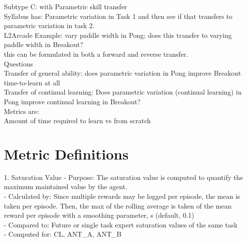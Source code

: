     Subtype C: with Parametric skill transfer\\
        Syllabus has: Parametric variation in Task 1 and then see if that transfers to parametric variation in task 2.\\
        L2Arcade Example: vary paddle width in Pong; does this transfer to varying paddle width in Breakout? \\
            this can be formulated in both a forward and reverse transfer.\\
        Questions\\
            Transfer of general ability: does parametric variation in Pong improve Breakout time-to-learn at all\\
            Transfer of continual learning: Does parametric variation (continual learning) in Pong improve continual learning in Breakout?\\
        Metrics are:\\
            Amount of time required to learn vs from scratch \\
            
\iffalse           
    Compositional skill transfer
        we see this as an instance of 3c 
            Hava mentioned this as a prime goal for L2M program.
            Concern
                How do we identify the "skill relationships" between the tasks? Do we need to do this before designing the syllabus?
            Motivation: system learns Tasks T1, T2, T3 (each having one or more "skills"). Then in T4, system has to use a combination of skills from the prior tasks.
            What this might mean in case of L2Arcade
                T1 = Pong (skills: paddle control, intercept ball, steer ball away from opposing paddle)
                T2 = Breakout (skills: paddle control, intercept ball, steer ball toward blocks)
                T3 = Freeway (skills: control ball, avoid blocks)
                T4 = PongBreakout (skills: paddle control, intercept ball, steer ball toward blocks, and away from opposing paddle)
\fi

\section{Metric Definitions}

1. Saturation Value
    - Purpose: The saturation value is computed to quantify the maximum maintained value by the agent.\\
    - Calculated by: Since multiple rewards may be logged per episode, the mean is taken per episode. Then, the max of the rolling average is taken of the mean reward per episode with a smoothing parameter, s (default, 0.1)\\
    - Compared to: Future or single task expert saturation values of the same task\\
    - Computed for: CL, ANT\_A, ANT\_B\\                   

